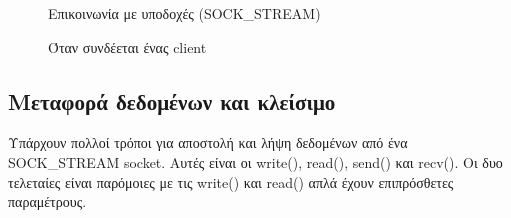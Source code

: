 \begin{figure} 
	\centering
	\caption{Επικοινωνία με υποδοχές (SOCK\_STREAM)}
\end{figure} 


\begin{figure} 
	\centering	{}
	\caption{Όταν συνδέεται ένας client}
	\label{socket_connect_ports}
\end{figure} 


\subsection*{Μεταφορά δεδομένων και κλείσιμο}
Υπάρχουν πολλοί τρόποι για αποστολή και λήψη δεδομένων από ένα SOCK\_STREAM socket. Αυτές είναι οι write(), read(), send() και recv(). Οι
δυο τελεταίες είναι παρόμοιες με τις write() και read() απλά έχουν επιπρόσθετες παραμέτρους.


